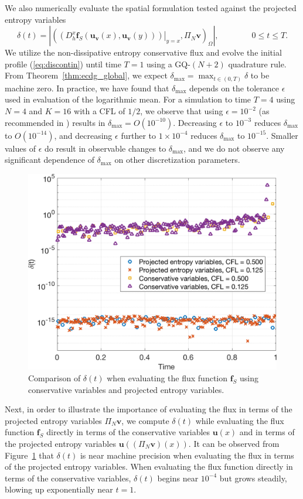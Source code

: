\documentclass[preprint,10pt]{elsarticle}
\theoremstyle{definition}
\theoremstyle{lemma}
\theoremstyle{theorem}
\theoremstyle{assumption}
\newcommand{\LRp}[1]{\left( #1 \right)}
\newcommand{\LRb}[1]{\left| #1 \right|}
\begin{document}
We also numerically evaluate the spatial formulation tested against the projected entropy variables
\[
\delta(t) = \LRb{\LRp{\left.\LRp{D^x_h \bm{f}_S(\bm{u}_{\bm{v}}(x),\bm{u}_{\bm{v}}(y))}\right|_{y=x},\Pi_N \bm{v}}_{\Omega}}, \qquad  \qquad 0\leq t \leq T.
\]
We utilize the non-dissipative entropy conservative flux and evolve the initial profile (\ref{eq:discontin}) until time $T = 1$ using a GQ-$(N+2)$ quadrature rule.  From Theorem~\ref{thm:ecdg_global}, we expect $\delta_{\max} = \max_{t\in (0,T)}{\delta}$ to be machine zero.  In practice, we have found that $\delta_{\max}$ depends on the tolerance $\epsilon$ used in evaluation of the logarithmic mean.  For a simulation to time $T=4$ using $N=4$ and $K = 16$ with a CFL of $1/2$, we observe that using $\epsilon = 10^{-2}$ (as recommended in \cite{ismail2009affordable}) results in $\delta_{\max} = O\LRp{10^{-10}}$.  Decreasing $\epsilon$ to $10^{-3}$ reduces $\delta_{\max}$ to $O\LRp{10^{-14}}$, and decreasing $\epsilon$ further to $1\times 10^{-4}$ reduces $\delta_{\max}$ to $10^{-15}$.  Smaller values of $\epsilon$ do result in observable changes to $\delta_{\max}$, and we do not observe any significant dependence of $\delta_{\max}$ on other discretization parameters.  

\begin{figure}
\centering
\includegraphics[width=.525\textwidth]{rhstest.png}
\caption{Comparison of $\delta(t)$ when evaluating the flux function $\bm{f}_S$ using conservative variables and projected entropy variables.}
\label{fig:rhstest}
\end{figure}
Next, in order to illustrate the importance of evaluating the flux in terms of the projected entropy variables $\Pi_N \bm{v}$, we compute $\delta(t)$ while evaluating the flux function $\bm{f}_S$ directly in terms of the conservative variables $\bm{u}(x)$ and in terms of the projected entropy variables $\bm{u}\LRp{(\Pi_N \bm{v})(x)}$.  It can be observed from Figure~\ref{fig:rhstest} that $\delta(t)$ is near machine precision when evaluating the flux in terms of the projected entropy variables.  When evaluating the flux function directly in terms of the conservative variables, $\delta(t)$ begins near $10^{-4}$ but grows steadily, blowing up exponentially near $t = 1$.  
\end{document}
